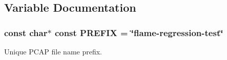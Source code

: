 \subsection{Variable Documentation}
\subsubsection[{\texorpdfstring{P\+R\+E\+F\+IX}{PREFIX}}]{\setlength{\rightskip}{0pt plus 5cm}const char$\ast$ const P\+R\+E\+F\+IX = \char`\"{}flame-\/regression-\/{\bf test}\char`\"{}}\hypertarget{flame-regression_8cc_a61dc66981fa47bfd0066a57a487c599c}{}\label{flame-regression_8cc_a61dc66981fa47bfd0066a57a487c599c}


Unique P\+C\+AP file name prefix. 

